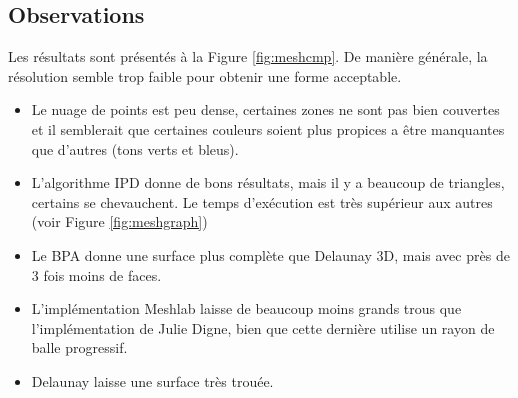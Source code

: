 \documentclass[a4paper,10pt]{report}
\begin{document}
\subsection{Observations}
Les résultats sont présentés à la Figure \ref{fig:meshcmp}. De manière générale, la résolution semble trop faible pour obtenir une forme acceptable.
\begin{itemize}
	\item Le nuage de points est peu dense, certaines zones ne sont pas bien couvertes et il semblerait que certaines couleurs soient plus propices a être manquantes que d'autres (tons verts et bleus).
    \item L'algorithme IPD donne de bons résultats, mais il y a beaucoup de triangles, certains se chevauchent. Le temps d'exécution est très supérieur aux autres (voir Figure \ref{fig:meshgraph})
    \item Le BPA donne une surface plus complète que Delaunay 3D, mais avec près de 3 fois moins de faces.
    \item L'implémentation Meshlab laisse de beaucoup moins grands trous que l'implémentation de Julie Digne, bien que cette dernière utilise un rayon de balle progressif.
    \item Delaunay laisse une surface très trouée.
\end{itemize}
\end{document}
